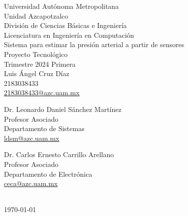 \begin{titlepage}
    \vspace*{\fill}
    \center
    
    \Large Universidad Autónoma Metropolitana\\
    \large {Unidad Azcapotzalco}\\
    \normalsize
    División de Ciencias Básicas e Ingeniería\\
    Licenciatura en Ingeniería en Computación\\[2cm]
    
    {\large Sistema para estimar la presión arterial a partir de sensores}\\

    Proyecto Tecnológico\\[1cm]
    
    Trimestre 2024 Primera \\[2cm]
    
    Luis Ángel Cruz Díaz\\
    2183038433\\
    \href{mailto:2183038433@azc.uam.mx}{2183038433@azc.uam.mx}\\[2cm]
    
    \begin{minipage}{0.4\textwidth}
        \centering
        Dr. Leonardo Daniel Sánchez Martínez \\
        Profesor Asociado\\
        Departamento de Sistemas\\
        \href{mailto:ldsm@azc.uam.mx}{ldsm@azc.uam.mx}
    \end{minipage}
    \begin{minipage}{0.4\textwidth}
        \centering
        Dr. Carlos Ernesto Carrillo Arellano\\
        Profesor Asociado\\
        Departamento de Electrónica\\
        \href{mailto:ceca@azc.uam.mx}{ceca@azc.uam.mx}%
    \end{minipage}\\[1cm]
    
    \textspanish{\today}
    
    \vfill
    \vspace*{\fill}
\end{titlepage}